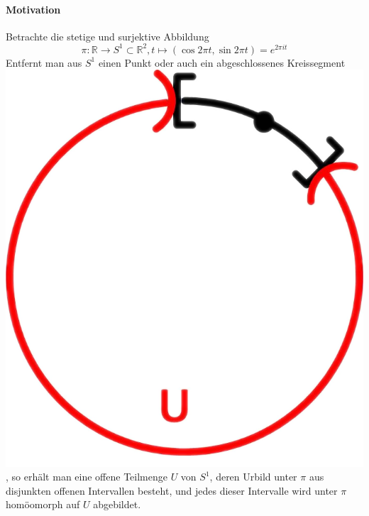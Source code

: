 \documentclass[a4paper,11pt,notitlepage]{report}
\theoremstyle{definition}
\newcommand{\R}{{\ensuremath{\mathbb{R}}}}
\begin{document}
\paragraph{Motivation} Betrachte die stetige und surjektive Abbildung $$\pi \colon \R \rightarrow S^1 \subset \R^2, t \mapsto (\cos 2 \pi t, \sin 2 \pi t) = e^{2 \pi i t}$$
Entfernt man aus $S^1$ einen Punkt oder auch ein abgeschlossenes Kreissegment \includegraphics[scale=0.2]{images/Kreissegment.png}, so erhält man eine offene Teilmenge $U$ von $S^1$, deren Urbild unter $\pi$ aus disjunkten offenen Intervallen besteht, und jedes dieser Intervalle wird unter $\pi$ homöomorph auf $U$ abgebildet.
\end{document}
